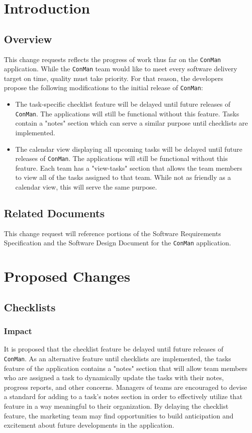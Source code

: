 \documentclass{article}
\begin{document}
 

\section{Introduction}
\subsection{Overview}
This change requests reflects the progress of work thus far on the \texttt{ConMan} application.
While the \texttt{ConMan} team would like to meet every software delivery target on time, quality must take priority.
For that reason, the developers propose the following modifications to the initial release of \texttt{ConMan}:
\begin{itemize}
\item The task-specific checklist feature will be delayed until future releases of \texttt{ConMan}.  
The applications will still be functional without this feature.  
Tasks contain a "notes" section which can serve a similar purpose until checklists are implemented.
\item The calendar view displaying all upcoming tasks will be delayed until future releases of \texttt{ConMan}.
The applications will still be functional without this feature.  
Each team has a "view-tasks" section that allows the team members to view all of the tasks assigned to that team.
While not as friendly as a calendar view, this will serve the same purpose.
\end{itemize}

\subsection{Related Documents}
This change request will reference portions of the Software Requirements Specification and the Software Design Document for the \texttt{ConMan} application.

\newpage
\section{Proposed Changes}
\subsection{Checklists}
\subsubsection{Impact}
It is proposed that the checklist feature be delayed until future releases of \texttt{ConMan}.  
As an alternative feature until checklists are implemented, the tasks feature of the application contains a "notes" section that will allow team members who are assigned a task to dynamically update the tasks with their notes, progress reports, and other concerns.
Managers of teams are encouraged to devise a standard for adding to a task's notes section in order to effectively utilize that feature in a way meaningful to their organization.
By delaying the checklist feature, the marketing team may find opportunities to build anticipation and excitement about future developments in the application.
\end{document}
